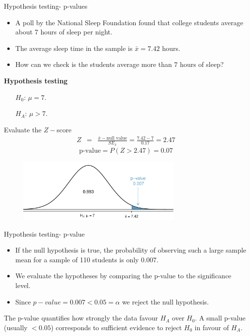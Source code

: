 \documentclass[12pt,a4paper]{beamer}
\begin{document}
\begin{frame}{Hypothesis testing- p-values}
	\begin{itemize}
		\item A poll by the National Sleep Foundation found that college students average about 7 hours of sleep per night.
		\item The average sleep time in the sample is $\bar{x}=7.42$ hours.
		\item How can we check is the students average more than $7$ hours of sleep?
	\end{itemize}
\end{frame}
\begin{frame}
	\textbf{Hypothesis testing}
	\begin{itemize}
	\setlength{\itemsep}{0mm}
	\item[$H_0$:] $\mu = 7$.
	\item[$H_A$:]$\mu>7$.
\end{itemize}
Evaluate the $Z-$score
\begin{eqnarray*}
Z &=& \frac{\bar{x} - \text{null value}}{SE_{\bar{x}}} = \frac{7.42 - 7}{0.17} = 2.47
\end{eqnarray*}
\[\text{p-value}=P(Z>2.47)=0.07\]
\begin{figure}[hht]
   \centering
   \includegraphics[width=0.73\textwidth]{figures/pValueOneSidedSleepStudy/pValueOneSidedSleepStudy}
  
   \label{pValueOneSidedSleepStudy}
\end{figure}
\end{frame}
\begin{frame}{Hypothesis testing- p-value}
\begin{itemize}
	\item If the null hypothesis is true, the probability of observing such a large sample mean for a sample of 110 students is only 0.007.
	\item We evaluate the hypotheses by comparing the p-value to the significance level.
	\item Since $p-value=0.007<0.05=\alpha$ we reject the null hypothesis.
\end{itemize}
\begin{framed}
The p-value quantifies how strongly the data favour $H_A$ over $H_0$. A small p-value (usually $<0.05$) corresponds to sufficient evidence to reject $H_0$ in favour of $H_A$.
\end{framed}
\end{frame}
\end{document}
